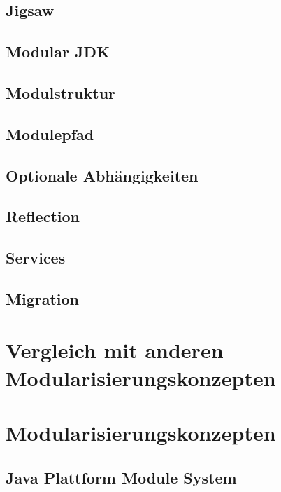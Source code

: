 \subsection{Jigsaw}
\subsection{Modular JDK}
\subsection{Modulstruktur}
\subsection{Modulepfad}
\subsection{Optionale Abhängigkeiten}
\subsection{Reflection}
\subsection{Services} 
\subsection{Migration}

\section{Vergleich mit anderen Modularisierungskonzepten}


\section{Modularisierungskonzepten}

\subsection{Java Plattform Module System}

